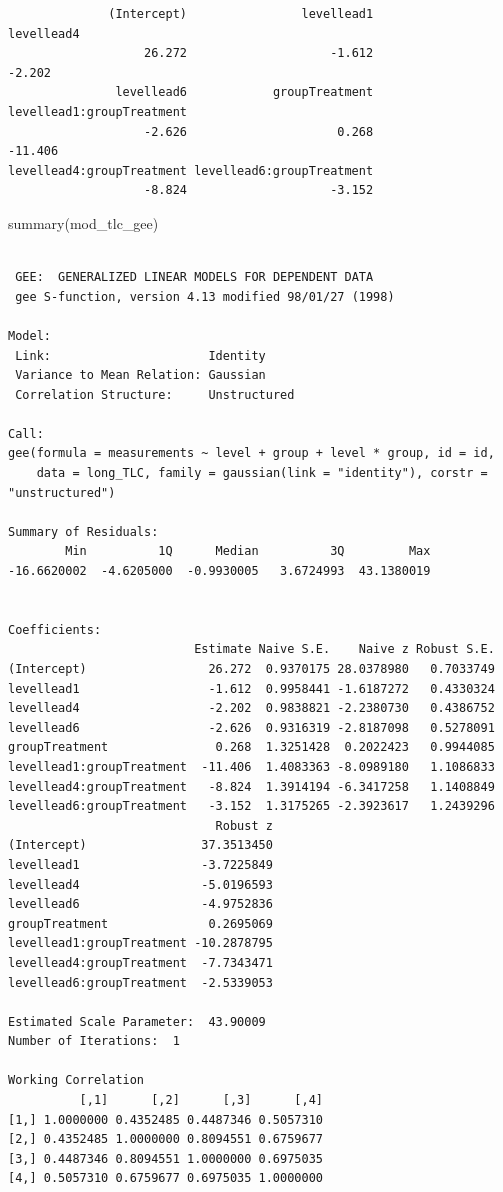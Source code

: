 \documentclass[
  letterpaper,
  DIV=11,
  numbers=noendperiod]{scrreprt}
\newenvironment{Shaded}{\begin{snugshade}}{\end{snugshade}}
\newcommand{\FunctionTok}[1]{\textcolor[rgb]{0.28,0.35,0.67}{#1}}
\newcommand{\NormalTok}[1]{\textcolor[rgb]{0.00,0.23,0.31}{#1}}
\begin{document}
\begin{verbatim}
              (Intercept)                levellead1                levellead4 
                   26.272                    -1.612                    -2.202 
               levellead6            groupTreatment levellead1:groupTreatment 
                   -2.626                     0.268                   -11.406 
levellead4:groupTreatment levellead6:groupTreatment 
                   -8.824                    -3.152 
\end{verbatim}

\begin{Shaded}
\begin{Highlighting}[]
\FunctionTok{summary}\NormalTok{(mod\_tlc\_gee)}
\end{Highlighting}
\end{Shaded}

\begin{verbatim}

 GEE:  GENERALIZED LINEAR MODELS FOR DEPENDENT DATA
 gee S-function, version 4.13 modified 98/01/27 (1998) 

Model:
 Link:                      Identity 
 Variance to Mean Relation: Gaussian 
 Correlation Structure:     Unstructured 

Call:
gee(formula = measurements ~ level + group + level * group, id = id, 
    data = long_TLC, family = gaussian(link = "identity"), corstr = "unstructured")

Summary of Residuals:
        Min          1Q      Median          3Q         Max 
-16.6620002  -4.6205000  -0.9930005   3.6724993  43.1380019 


Coefficients:
                          Estimate Naive S.E.    Naive z Robust S.E.
(Intercept)                 26.272  0.9370175 28.0378980   0.7033749
levellead1                  -1.612  0.9958441 -1.6187272   0.4330324
levellead4                  -2.202  0.9838821 -2.2380730   0.4386752
levellead6                  -2.626  0.9316319 -2.8187098   0.5278091
groupTreatment               0.268  1.3251428  0.2022423   0.9944085
levellead1:groupTreatment  -11.406  1.4083363 -8.0989180   1.1086833
levellead4:groupTreatment   -8.824  1.3914194 -6.3417258   1.1408849
levellead6:groupTreatment   -3.152  1.3175265 -2.3923617   1.2439296
                             Robust z
(Intercept)                37.3513450
levellead1                 -3.7225849
levellead4                 -5.0196593
levellead6                 -4.9752836
groupTreatment              0.2695069
levellead1:groupTreatment -10.2878795
levellead4:groupTreatment  -7.7343471
levellead6:groupTreatment  -2.5339053

Estimated Scale Parameter:  43.90009
Number of Iterations:  1

Working Correlation
          [,1]      [,2]      [,3]      [,4]
[1,] 1.0000000 0.4352485 0.4487346 0.5057310
[2,] 0.4352485 1.0000000 0.8094551 0.6759677
[3,] 0.4487346 0.8094551 1.0000000 0.6975035
[4,] 0.5057310 0.6759677 0.6975035 1.0000000
\end{verbatim}
\end{document}
